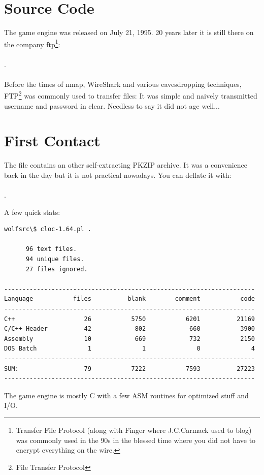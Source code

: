 \documentclass[book.tex]{subfiles}
\begin{document}
\section{Source Code}
The game engine was released on July 21, 1995. 20 years later it is still there on the company ftp\footnote{Transfer File Protocol (along with Finger where J.C.Carmack used to blog) was commonly used in the 90s in the blessed time where you did not have to encrypt everything on the wire.}:\\ 
\\.\\
\\
 Before the times of nmap, WireShark and various eavesdropping techniques, FTP\footnote{File Transfer Protocol} was commonly used to transfer files: It was simple and naively transmitted username and password in clear. Needless to say it did not age well...\\

\section{First Contact}
The file  contains an other self-extracting PKZIP archive. It was a convenience back in the day but it is not practical nowadays. You can deflate it with:\\
\\.\\
\par
A few quick stats:\\
\begin{verbatim}
wolfsrc\$ cloc-1.64.pl .

      96 text files.
      94 unique files.                              
      27 files ignored.

---------------------------------------------------------------------
Language           files          blank        comment           code
---------------------------------------------------------------------
C++                   26           5750           6201          21169
C/C++ Header          42            802            660           3900
Assembly              10            669            732           2150
DOS Batch              1              1              0              4
---------------------------------------------------------------------
SUM:                  79           7222           7593          27223
---------------------------------------------------------------------
\end{verbatim}
The game engine is mostly C with a few ASM routines for optimized stuff and I/O.\\
\end{document}
